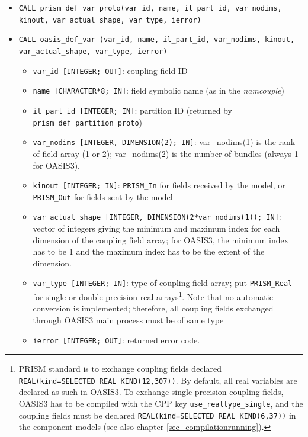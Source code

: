 \begin{itemize}

\item {\tt CALL prism\_def\_var\_proto(var\_id, name, il\_part\_id,
  var\_nodims, kinout, var\_actual\_shape, var\_type, ierror)}
\item {\tt CALL oasis\_def\_var       (var\_id, name, il\_part\_id,
  var\_nodims, kinout, var\_actual\_shape, var\_type, ierror)}

\begin{itemize}
 \item {\tt var\_id [INTEGER; OUT]}: coupling field ID
 \item {\tt name [CHARACTER*8; IN]}: field symbolic name (as in the
   {\it namcouple})
 \item {\tt il\_part\_id [INTEGER; IN]}: partition ID (returned by
   {\tt prism\_def\_partition\-\_proto})
 \item {\tt var\_nodims [INTEGER, DIMENSION(2); IN]}: var\_nodims(1) is
   the rank of field array (1 or 2); var\_nodims(2) is the number of
   bundles (always 1 for OASIS3). 
 \item {\tt kinout [INTEGER; IN]}: {\tt PRISM\_In} for fields received by
   the model, or {\tt PRISM\_Out} for fields sent by the model 
 \item {\tt var\_actual\_shape [INTEGER, DIMENSION(2*var\_nodims(1)); IN]}: 
   vector of integers giving the minimum and maximum index for each
   dimension of the coupling field array; for OASIS3, the minimum
   index has to be 1 and the maximum index has to be the extent of the
   dimension.
 \item {\tt var\_type [INTEGER; IN]}: type of coupling field array;
   put {\tt PRISM\_Real} for single or double precision real
   arrays\footnote{PRISM standard is to exchange coupling fields
   declared {\tt REAL(kind=SELECTED\_REAL\_KIND(12,307))}. By default,
   all real variables are declared as such in OASIS3. To exchange
   single precision coupling fields, OASIS3 has to be compiled with
   the CPP key {\tt use\_realtype\_single}, and the coupling fields
   must be declared {\tt REAL(kind=SELECTED\_REAL\_KIND(6,37))} in the
   component models (see also chapter \ref{sec_compilationrunning}).}. 
   Note that no automatic conversion is implemented;
   therefore, all coupling fields exchanged through OASIS3 main
   process must be of same type
 \item {\tt ierror [INTEGER; OUT]}: returned error code. 
\end{itemize}
\end{itemize}

